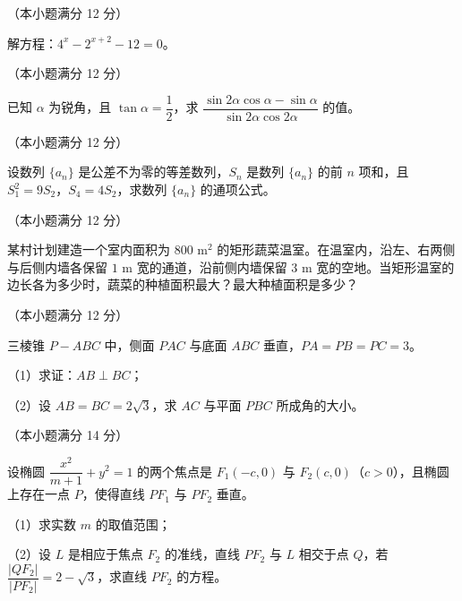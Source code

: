 \begin{question}
（本小题满分 12 分）

解方程：$4^x-2^{x+2}-12=0$。

\end{question}
\begin{question}
（本小题满分 12 分）

已知 $\alpha$ 为锐角，且 $\tan\alpha=\dfrac{1}{2}$，求 $\dfrac{\sin 2\alpha\cos\alpha-\sin\alpha}{\sin 2\alpha\cos 2\alpha}$ 的值。

\end{question}
\begin{question}
（本小题满分 12 分）

设数列 $\{a_n\}$ 是公差不为零的等差数列，$S_n$ 是数列 $\{a_n\}$ 的前 $n$ 项和，且 $S_1^2=9S_2$，$S_4=4S_2$，求数列 $\{a_n\}$ 的通项公式。

\end{question}
\begin{question}
（本小题满分 12 分）

某村计划建造一个室内面积为 $800\text{ m}^2$ 的矩形蔬菜温室。在温室内，沿左、右两侧与后侧内墙各保留 $1\text{ m}$ 宽的通道，沿前侧内墙保留 $3\text{ m}$ 宽的空地。当矩形温室的边长各为多少时，蔬菜的种植面积最大？最大种植面积是多少？

\Needspace{0.4\textheight}
\end{question}
\begin{question}
（本小题满分 12 分）

三棱锥 $P-ABC$ 中，侧面 $PAC$ 与底面 $ABC$ 垂直，$PA=PB=PC=3$。
\nopagebreak[4]
\begin{center}\end{center}
\nopagebreak[4]
（1）求证：$AB\perp BC$；

（2）设 $AB=BC=2\sqrt{3}$，求 $AC$ 与平面 $PBC$ 所成角的大小。

\end{question}
\begin{question}
（本小题满分 14 分）

设椭圆 $\dfrac{x^2}{m+1}+y^2=1$ 的两个焦点是 $F_1(-c,0)$ 与 $F_2(c,0)$（$c>0$），且椭圆上存在一点 $P$，使得直线 $PF_1$ 与 $PF_2$ 垂直。

（1）求实数 $m$ 的取值范围；

（2）设 $L$ 是相应于焦点 $F_2$ 的准线，直线 $PF_2$ 与 $L$ 相交于点 $Q$，若 $\dfrac{|QF_2|}{|PF_2|}=2-\sqrt{3}$，求直线 $PF_2$ 的方程。

\end{question}